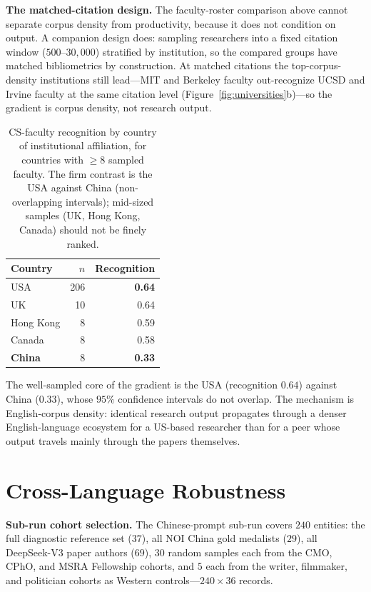 \textbf{The matched-citation design.} The faculty-roster comparison above cannot separate corpus density from productivity, because it does not condition on output. A companion design does: sampling researchers into a fixed citation window ($500$--$30{,}000$) stratified by institution, so the compared groups have matched bibliometrics by construction. At matched citations the top-corpus-density institutions still lead---MIT and Berkeley faculty out-recognize UCSD and Irvine faculty at the same citation level (Figure~\ref{fig:universities}b)---so the gradient is corpus density, not research output.

\begin{table}[!htbp]
\centering
\small
\caption{CS-faculty recognition by country of institutional affiliation, for countries with $\geq 8$ sampled faculty. The firm contrast is the USA against China (non-overlapping intervals); mid-sized samples (UK, Hong Kong, Canada) should not be finely ranked.}
\label{tab:cs-country}
\begin{tabular}{lrr}
\toprule
Country & $n$ & Recognition \\
\midrule
USA & 206 & \textbf{0.64} \\
UK & 10 & 0.64 \\
Hong Kong & 8 & 0.59 \\
Canada & 8 & 0.58 \\
\textbf{China} & 8 & \textbf{0.33} \\
\bottomrule
\end{tabular}
\end{table}

The well-sampled core of the gradient is the USA (recognition $0.64$) against China ($0.33$), whose $95\%$ confidence intervals do not overlap. The mechanism is English-corpus density: identical research output propagates through a denser English-language ecosystem for a US-based researcher than for a peer whose output travels mainly through the papers themselves.


\section{Cross-Language Robustness}
\label{app:cross-lang}

\textbf{Sub-run cohort selection.} The Chinese-prompt sub-run covers $240$ entities: the full diagnostic reference set ($37$), all NOI China gold medalists ($29$), all DeepSeek-V3 paper authors ($69$), $30$ random samples each from the CMO, CPhO, and MSRA Fellowship cohorts, and $5$ each from the writer, filmmaker, and politician cohorts as Western controls---$240 \times 36$ records.

